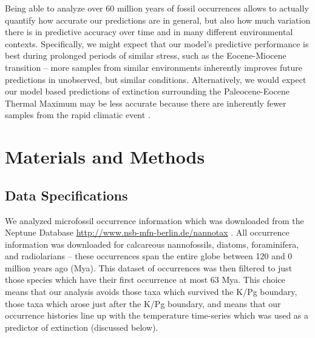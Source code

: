 \documentclass[12pt,letterpaper]{article}
\begin{document}

Being able to analyze over 60 million years of fossil occurrences allows to actually quantify how accurate our predictions are in general, but also how much variation there is in predictive accuracy over time and in many different environmental contexts. Specifically, we might expect that our model's predictive performance is best during prolonged periods of similar stress, such as the Eocene-Miocene transition \citep{Zachos2008} -- more samples from similar environments inherently improves future predictions in unobserved, but similar conditions. Alternatively, we would expect our model based predictions of extinction surrounding the Paleocene-Eocene Thermal Maximum may be less accurate because there are inherently fewer samples from the rapid climatic event \citep{Zachos2008}.



\section{Materials and Methods}

\subsection{Data Specifications}

We analyzed microfossil occurrence information which was downloaded from the Neptune Database \url{http://www.nsb-mfn-berlin.de/nannotax} \citep{Lazarus1994,SpencerCervato1999}. All occurrence information was downloaded for calcareous nannofossils, diatoms, foraminifera, and radiolarians -- these occurrences span the entire globe between 120 and 0 million years ago (Mya). This dataset of occurrences was then filtered to just those species which have their first occurrence at most 63 Mya. This choice means that our analysis avoids those taxa which survived the K/Pg boundary, those taxa which arose just after the K/Pg boundary, and means that our occurrence histories line up with the temperature time-series which was used as a predictor of extinction (discussed below).
\end{document}

